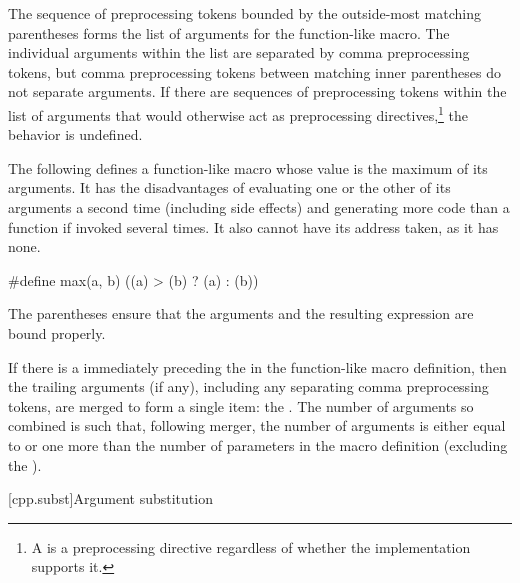 \pnum
{}%
The sequence of preprocessing tokens
bounded by the outside-most matching parentheses
forms the list of arguments for the function-like macro.
The individual arguments within the list
are separated by comma preprocessing tokens,
but comma preprocessing tokens between matching
inner parentheses do not separate arguments.
If there are sequences of preprocessing tokens within the list of
arguments that would otherwise act as preprocessing directives,\footnote{A  is a preprocessing directive regardless of whether the implementation supports it.}
the behavior is undefined.

\pnum
\begin{example}
The following defines a function-like
macro whose value is the maximum of its arguments.
It has the disadvantages of evaluating one or the other of its arguments
a second time
(including
%
side effects)
and generating more code than a function if invoked several times.
It also cannot have its address taken,
as it has none.

\begin{codeblock}
#define max(a, b) ((a) > (b) ? (a) : (b))
\end{codeblock}

The parentheses ensure that the arguments and
the resulting expression are bound properly.
\end{example}

\pnum
{}%
If there is a  immediately preceding the \tcode{)} in the
function-like macro
definition, then the trailing arguments (if any), including any separating comma preprocessing
tokens, are merged to form a single item: the . The number of
arguments so combined is such that, following merger, the number of arguments is
either equal to or
one more than the number of parameters in the macro definition (excluding the
).

[cpp.subst]{Argument substitution}%
%
%

%
\begin{bnf}
\br
      \terminal{)}
\end{bnf}

